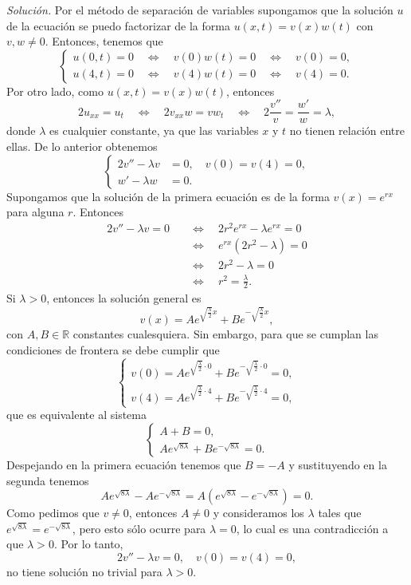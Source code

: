\documentclass[12pt]{article}
\newcommand{\sol}{\textit{Solución. }}
\newcommand{\R}{\mathbb{R}}
\newcommand{\pp}[1]{\left( #1 \right)}
\newcommand{\Ssi}{\quad\Longleftrightarrow\quad}
\renewcommand{\l}{\lambda}
\begin{document}
\begin{enumerate}
\begin{enumerate}
            \sol Por el método de separación de variables supongamos que la solución $u$ de la ecuación se puedo factorizar de la forma $u(x,t)=v(x) w(t)$ con $v,w\neq0$. Entonces, tenemos que
            \[
            \begin{cases}
                u(0,t) =0 \Ssi v(0) w(t) =0 \Ssi  v(0)=0,\\
                u(4,t) =0 \Ssi v(4) w(t) =0 \Ssi v(4) = 0.
            \end{cases}
            \]
            Por otro lado, como $u(x,t)=v(x) w(t)$, entonces
            \[ 2u_{xx} = u_t \Ssi 2v_{xx}w = vw_t\Ssi 2\frac{v''}{v} = \frac{w'}{w}=\l, \]
            donde $\l$ es cualquier constante, ya que las variables $x$ y $t$ no tienen relación entre ellas. De lo anterior obtenemos
            \[
            \begin{cases}
                2v''-\l v &=0, \quad v(0)=v(4)=0,\\
                w'-\l w &=0.
            \end{cases}
            \]
            Supongamos que la solución de la primera ecuación es de la forma $v(x)=e^{rx}$ para alguna $r$. Entonces
            \begin{align*}
                2v''-\l v =0 &\Ssi2r^2e^{rx}-\l e^{rx}=0\\
                & \Ssi e^{rx}(2r^2-\l)=0\\
                &\Ssi 2r^2-\l=0\\
                &\Ssi r^2=\frac{\l}{2}.
            \end{align*}
            Si $\l>0$, entonces la solución general es
            \[ v(x) = A e^{\sqrt{\tfrac{\l}{2}}x} + B e^{-\sqrt{\tfrac{\l}{2}}x}, \]
            con $A, B\in\R$ constantes cualesquiera. Sin embargo, para que se cumplan las condiciones de frontera se debe cumplir que
            \[
            \begin{cases}
                v(0)=A e^{\sqrt{\tfrac{\l}{2}}\cdot 0} + B e^{-\sqrt{\tfrac{\l}{2}}\cdot 0} =0,\\
                v(4)=A e^{\sqrt{\tfrac{\l}{2}}\cdot 4} + B e^{-\sqrt{\tfrac{\l}{2}}\cdot4}=0,
            \end{cases}
            \]
            que es equivalente al sistema
            \[
            \begin{cases}
                A + B  =0,\\
                A e^{\sqrt{8\l}} + B e^{-\sqrt{8\l}}=0.
            \end{cases}
            \]
            Despejando en la primera ecuación tenemos que $B=-A$ y sustituyendo en la segunda tenemos
            \[ A e^{\sqrt{8\l}} -A e^{-\sqrt{8\l}}=A\pp{e^{\sqrt{8\l}} -e^{-\sqrt{8\l}}}=0. \]
            Como pedimos que $v\neq 0$, entonces $A\neq 0$ y consideramos los $\l$ tales que $e^{\sqrt{8\l}} =e^{-\sqrt{8\l}}$, pero esto sólo ocurre para $\l=0$, lo cual es una contradicción a que $\l>0$. Por lo tanto, 
            \[ 2v''-\l v =0, \quad v(0)=v(4)=0, \]
            no tiene solución no trivial para $\l>0$.


\end{enumerate}
\end{enumerate}
\end{document}
